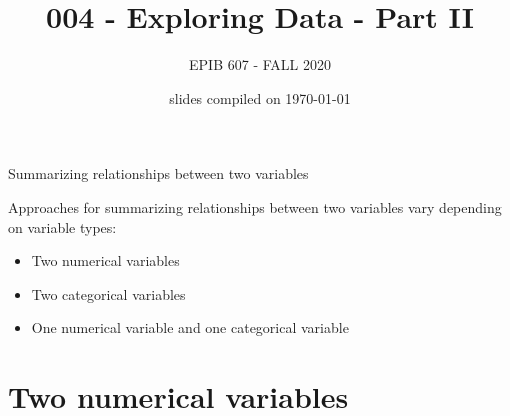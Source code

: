\documentclass[10pt,handout]{beamer}\usepackage[]{graphicx}\usepackage[]{color}
\begin{document}
	
	
	
	
	\title{004 - Exploring Data - Part II}
	\author{EPIB 607 - FALL 2020}
	
	\date{slides compiled on \today}
	
	\maketitle

	
	

						
\begin{frame}{Summarizing relationships between two variables}
							\protect\hypertarget{summarizing-relationships-between-two-variables}{}
							
							Approaches for summarizing relationships between two variables vary
							depending on variable types:
							
							\begin{itemize}
								\item
								Two numerical variables
								\item
								Two categorical variables
								\item
								One numerical variable and one categorical variable
							\end{itemize}
							
\end{frame}


\section{Two numerical variables}
\end{document}
